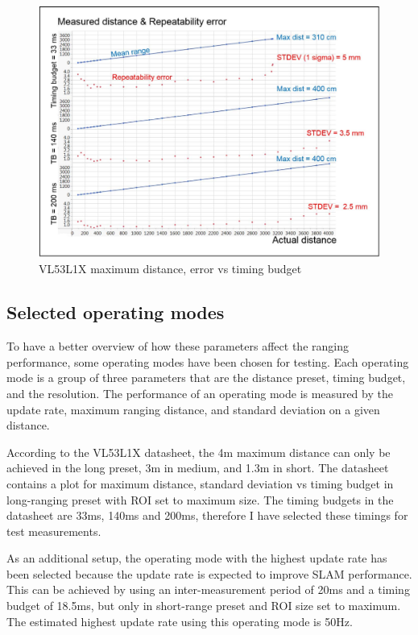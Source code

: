 \begin{figure}[!ht]
    \centering
    \includegraphics[width=140mm, keepaspectratio]{figures/vl53l1x_timing_budget.png}
    \caption{VL53L1X maximum distance, error vs timing budget \cite{VL53L1XDatasheet}}
    \label{fig:vl53l1x_timing_budget}
\end{figure}

\subsection{Selected operating modes}
To have a better overview of how these parameters affect the ranging performance, some operating modes
have been chosen for testing. Each operating mode is a group of three parameters that are the distance preset,
timing budget, and the resolution. The performance of an operating mode is measured by the update rate, maximum
ranging distance, and standard deviation on a given distance.

According to the VL53L1X datasheet, the 4m maximum distance can only be achieved in the long preset, 3m in medium,
and 1.3m in short. The datasheet contains a plot for maximum distance, standard deviation vs timing budget
in long-ranging preset with ROI set to maximum size. The timing budgets in the datasheet are 33ms,
140ms and 200ms, therefore I have selected these timings for test measurements.

As an additional setup, the operating mode with the highest update rate has been selected because the update rate is
expected to improve SLAM performance. This can be achieved by using an inter-measurement period of 20ms and
a timing budget of 18.5ms, but only in short-range preset and ROI size set to maximum. The estimated highest
update rate using this operating mode is 50Hz.

